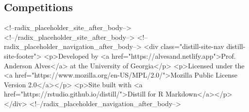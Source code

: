 \documentclass[11pt,a4paper,]{awesome-cv}
\begin{document}
\hypertarget{competitions}{%
\subsection{Competitions}\label{competitions}}

\begin{cvhonors}
\end{cvhonors}

<!--radix_placeholder_site_after_body-->
<!--/radix_placeholder_site_after_body-->
<!--radix_placeholder_navigation_after_body-->
<div class="distill-site-nav distill-site-footer">
<p>Developed by <a href="https://alvesand.netlify.app">Prof. Anderson
Alves</a> at the University of Georgia</p>
<p>Licensed under the
<a href="https://www.mozilla.org/en-US/MPL/2.0/">Mozilla Public License
Version 2.0</a></p>
<p>Site built with <a href="https://rstudio.github.io/distill/">Distill
for R Markdown</a></p>
</div>
<!--/radix_placeholder_navigation_after_body-->
\end{document}
